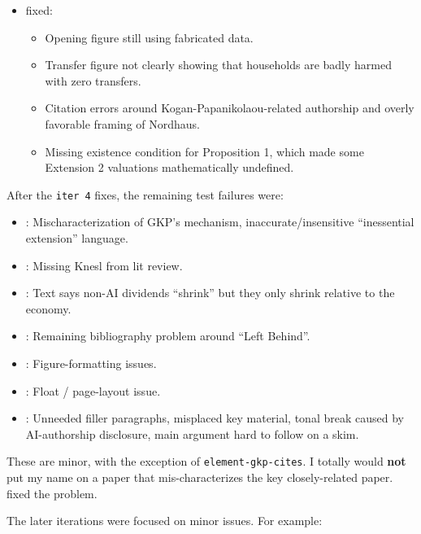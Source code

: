 \documentclass[12pt]{article}
\begin{document}
\begin{itemize}
\item {} fixed:
\begin{itemize}
\item Opening figure still using fabricated data.
\item Transfer figure not clearly showing that households are badly harmed with zero transfers.
\item Citation errors around Kogan-Papanikolaou-related authorship and overly favorable framing of Nordhaus.
\item Missing existence condition for Proposition 1, which made some Extension 2 valuations mathematically undefined.
\end{itemize}
\end{itemize}

After the \texttt{iter 4} fixes, the remaining test failures were:

\begin{itemize}
\item {}: Mischaracterization of GKP's mechanism, inaccurate/insensitive ``inessential extension'' language.
\item {}: Missing Knesl from lit review.
\item {}: Text says non-AI dividends ``shrink'' but they only shrink relative to the economy.
\item {}: Remaining bibliography problem around ``Left Behind''.
\item {}: Figure-formatting issues.
\item {}: Float / page-layout issue.
\item {}: Unneeded filler paragraphs, misplaced key material, tonal break caused by AI-authorship disclosure, main argument hard to follow on a skim.
\end{itemize}

These are minor, with the exception of \texttt{element-gkp-cites}. I totally would \textbf{not} put my name on a paper that mis-characterizes the key closely-related paper.  fixed the problem.

The later iterations were focused on minor issues. For example:
\end{document}
